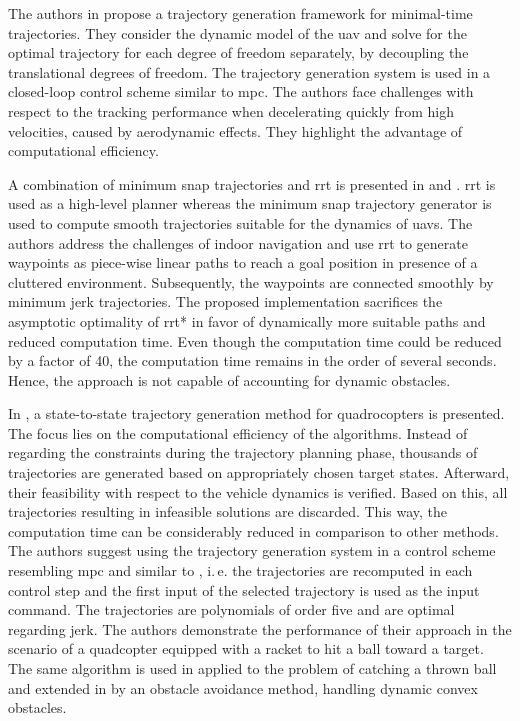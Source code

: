The authors in \cite{Hehn11} propose a trajectory generation framework for minimal-time trajectories. They consider the dynamic model of the \ac{uav} and solve for the optimal trajectory for each degree of freedom separately, by decoupling the translational degrees of freedom. The trajectory generation system is used in a closed-loop control scheme similar to \ac{mpc}. The authors face challenges with respect to the tracking performance when decelerating quickly from high velocities, caused by aerodynamic effects. They highlight the advantage of computational efficiency.

A combination of minimum snap trajectories and \ac{rrt} is presented in \cite{Richter16} and \cite{Shi20}.
\ac{rrt} is used as a high-level planner whereas the minimum snap trajectory generator is used to compute smooth trajectories suitable for the dynamics of \acp{uav}. 
The authors address the challenges of indoor navigation and use \ac{rrt} to generate waypoints as piece-wise linear paths to reach a goal position in presence of a cluttered environment. Subsequently, the waypoints are connected smoothly by minimum jerk trajectories.
The proposed implementation sacrifices the asymptotic optimality of \ac{rrt}* in favor of dynamically more suitable paths and reduced computation time. Even though the computation time could be reduced by a factor of 40, the computation time remains in the order of several seconds. Hence, the approach is not capable of accounting for dynamic obstacles.

In \cite{Mueller13}, a state-to-state trajectory generation method for quadrocopters is presented. The focus lies on the computational efficiency of the algorithms.
Instead of regarding the constraints during the trajectory planning phase, thousands of trajectories are generated based on appropriately chosen target states.
Afterward, their feasibility with respect to the vehicle dynamics is verified.
Based on this, all trajectories resulting in infeasible solutions are discarded.
This way, the computation time can be considerably reduced in comparison to other methods.
The authors suggest using the trajectory generation system in a control scheme resembling \ac{mpc} and similar to \cite{Hehn11}, i.\,e. the trajectories are recomputed in each control step and the first input of the selected trajectory is used as the input command. 
The trajectories are polynomials of order five and are optimal regarding jerk.
The authors demonstrate the performance of their approach in the scenario of a quadcopter equipped with a racket to hit a ball toward a target. The same algorithm is used in \cite{MuellerHehn15} applied to the problem of catching a thrown ball and extended in \cite{Bucki19} by an obstacle avoidance method, handling dynamic convex obstacles.


